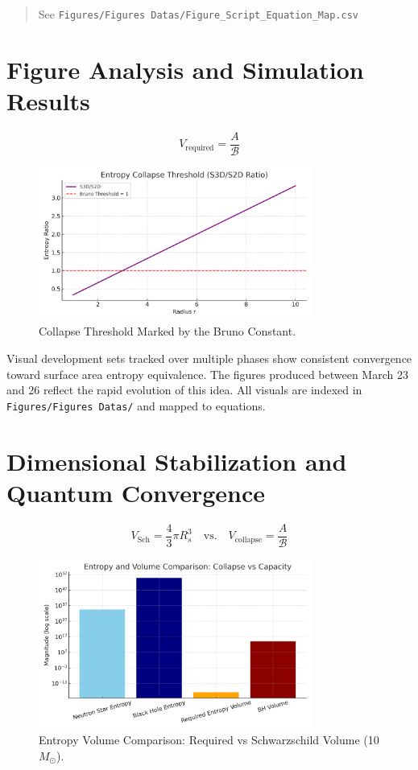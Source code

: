 \documentclass[12pt]{article}
\begin{document}
\begin{quote}
See \texttt{Figures/Figures~Datas/Figure\_Script\_Equation\_Map.csv}
\end{quote}

\section{Figure Analysis and Simulation Results}

\vspace{0.5em}
\[
V_{\text{required}} = \frac{A}{\mathcal{B}}
\]


\begin{figure}[H]
    \centering
    \includegraphics[width=0.8\textwidth]{fig_04_collapse_threshold.png}
    \caption{Collapse Threshold Marked by the Bruno Constant.}
    \label{fig:collapse_threshold}
\end{figure}

Visual development sets tracked over multiple phases show consistent convergence toward surface area entropy equivalence. The figures produced between March 23 and 26 reflect the rapid evolution of this idea. All visuals are indexed in \texttt{Figures/Figures Datas/} and mapped to equations.

\section{Dimensional Stabilization and Quantum Convergence}

\vspace{0.5em}
\[
V_{\text{Sch}} = \frac{4}{3} \pi R_s^3 \quad \text{vs.} \quad V_{\text{collapse}} = \frac{A}{\mathcal{B}}
\]


\begin{figure}[H]
    \centering
    \includegraphics[width=0.8\textwidth]{fig_07_surface_vs_volume.png}
    \caption{Entropy Volume Comparison: Required vs Schwarzschild Volume (10 $M_\odot$).}
    \label{fig:volume_comparison}
\end{figure}
\end{document}
